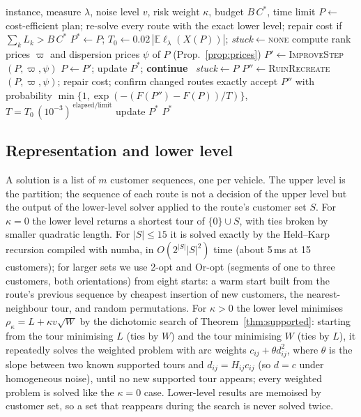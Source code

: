 \documentclass[11pt]{article}
\theoremstyle{definition}
\newcommand{\E}{\mathbb{E}}
\newcommand{\lord}{\ell_\lambda}
\begin{document}
\begin{algorithm}[t]
\caption{SORTIE: main loop}\label{alg:sortie}
\begin{algorithmic}[1]
\Require instance, measure $\lambda$, noise level $v$, risk weight $\kappa$, budget $B\,C^\ast$, time limit
\State $P\gets$ cost-efficient plan; re-solve every route with the exact lower level; repair cost if $\sum_kL_k>B\,C^\ast$
\State $P^\ast\gets P$; $T_0\gets0.02\,|\E\lord(X(P))|$; \textit{stuck}$\gets$\textsc{none}
  \State compute rank prices $\varpi$ and dispersion prices $\psi$ of $P$ (Prop.~\ref{prop:prices})
    \State $P'\gets$\textsc{ImproveStep}$(P,\varpi,\psi)$ 
     $P\gets P'$; update $P^\ast$; \textbf{continue}
    \Else\ \textit{stuck}$\gets P$
    \EndIf
  \EndIf
  \State $P''\gets$\textsc{RuinRecreate}$(P,\varpi,\psi)$; repair cost; confirm changed routes exactly
  \State accept $P''$ with probability $\min\{1,\exp(-(F(P'')-F(P))/T)\}$, $T=T_0\,(10^{-3})^{\,\text{elapsed}/\text{limit}}$
  \State update $P^\ast$
\EndWhile
\State \Return $P^\ast$
\end{algorithmic}
\end{algorithm}



\subsection{Representation and lower level}\label{sec:alg:lower}
A solution is a list of $m$ customer sequences, one per vehicle. The upper
level is the partition; the sequence of each route is not a decision of the
upper level but the output of the lower-level solver applied to the route's
customer set $S$. For $\kappa=0$ the lower level returns a shortest tour of
$\{0\}\cup S$, with ties broken by smaller quadratic length. For $|S|\le15$ it
is solved exactly by the Held--Karp recursion \citep{heldkarp1962dynamic}
compiled with numba, in $O(2^{|S|}|S|^2)$ time (about 5\,ms at 15
customers); for larger sets we use 2-opt and Or-opt (segments of one to three
customers, both orientations) from eight starts: a warm start built from the
route's previous sequence by cheapest insertion of new customers, the
nearest-neighbour tour, and random permutations. For $\kappa>0$ the lower
level minimises $\rho_\kappa=L+\kappa v\sqrt W$ by the dichotomic search of
Theorem~\ref{thm:supported}: starting from the tour minimising $L$ (ties by
$W$) and the tour minimising $W$ (ties by $L$), it repeatedly solves the
weighted problem with arc weights $c_{ij}+\theta d_{ij}^2$, where $\theta$ is
the slope between two known supported tours and $d_{ij}=H_{ij}c_{ij}$ (so
$d=c$ under homogeneous noise), until no new supported tour appears; every
weighted problem is solved like the $\kappa=0$ case. Lower-level results are
memoised by customer set, so a set that reappears during the search is never
solved twice.
\end{document}
